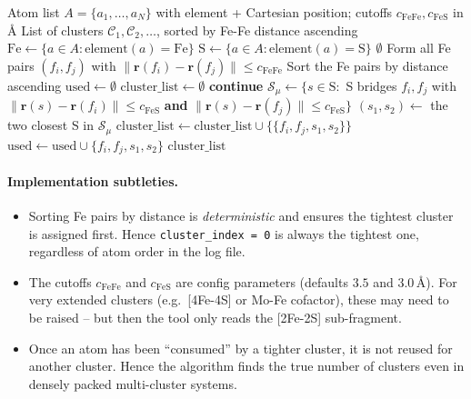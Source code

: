 \documentclass[11pt,a4paper,twoside]{article}
\providecommand{\angstrom}{\text{\AA}}    %
\theoremstyle{remark}
\begin{document}
\begin{algorithm}[H]
\caption{\textsc{FindAllClusters}}
\begin{algorithmic}[1]
\Require Atom list $A = \{a_1, \ldots, a_N\}$ with element +
         Cartesian position; cutoffs $c_\text{FeFe}, c_\text{FeS}$
         in $\angstrom$
\Ensure List of clusters $\mathcal{C}_1, \mathcal{C}_2, \ldots$,
        sorted by Fe-Fe distance ascending
\State $\text{Fe} \gets \{a \in A : \text{element}(a) = \text{Fe}\}$
\State $\text{S}  \gets \{a \in A : \text{element}(a) = \text{S}\}$
  \State \Return $\emptyset$  
\EndIf
\State Form all Fe pairs $(f_i, f_j)$ with
       $\|\mathbf{r}(f_i) - \mathbf{r}(f_j)\| \leq c_\text{FeFe}$
\State Sort the Fe pairs by distance ascending
\State $\text{used} \gets \emptyset$  
\State $\text{cluster\_list} \gets \emptyset$
    \State \textbf{continue}  
  \EndIf
  \State $\mathcal{S}_\mu \gets \{s \in \text{S} :$ S bridges $f_i, f_j$
         with $\|\mathbf{r}(s) - \mathbf{r}(f_i)\| \leq c_\text{FeS}$
         \textbf{and} $\|\mathbf{r}(s) - \mathbf{r}(f_j)\| \leq c_\text{FeS}\}$
    
    \State $(s_1, s_2) \gets$ the two closest S in $\mathcal{S}_\mu$
    \State $\text{cluster\_list} \gets \text{cluster\_list} \cup
           \{\{f_i, f_j, s_1, s_2\}\}$
    \State $\text{used} \gets \text{used} \cup \{f_i, f_j, s_1, s_2\}$
  \EndIf
\EndFor
\State \Return $\text{cluster\_list}$
\end{algorithmic}
\end{algorithm}

\paragraph{Implementation subtleties.}
\begin{itemize}\setlength{\itemsep}{0pt}
  \item Sorting Fe pairs by distance is \emph{deterministic} and
        ensures the tightest cluster is assigned first. Hence
        \texttt{cluster\_index = 0} is always the tightest one,
        regardless of atom order in the log file.
  \item The cutoffs $c_\text{FeFe}$ and $c_\text{FeS}$ are config
        parameters (defaults $3.5$ and $3.0\,\angstrom$). For very
        extended clusters (e.g.\ [4Fe-4S] or Mo-Fe cofactor),
        these may need to be raised -- but then the tool only
        reads the [2Fe-2S] sub-fragment.
  \item Once an atom has been ``consumed'' by a tighter cluster,
        it is not reused for another cluster. Hence the algorithm
        finds the true number of clusters even in densely packed
        multi-cluster systems.
\end{itemize}
\end{document}
